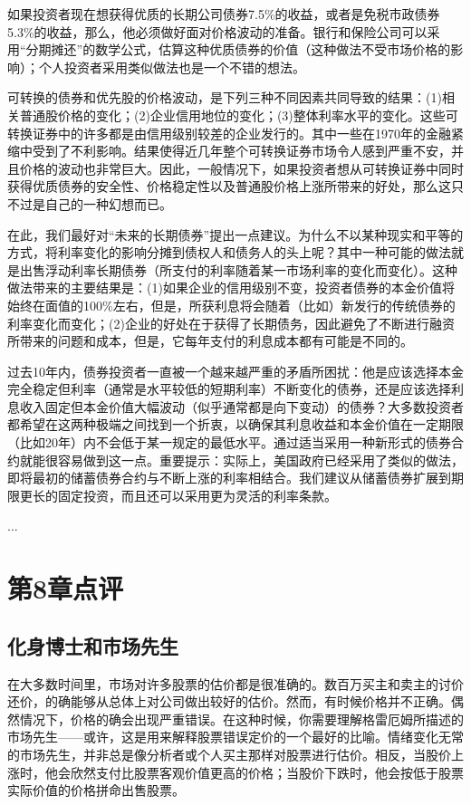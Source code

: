 \documentclass[12pt,oneside]{book}
\begin{document}
如果投资者现在想获得优质的长期公司债券7.5\%的收益，或者是免税市政债券5.3\%的收益，那么，他必须做好面对价格波动的准备。银行和保险公司可以采用“分期摊还”的数学公式，估算这种优质债券的价值（这种做法不受市场价格的影响）；个人投资者采用类似做法也是一个不错的想法。

可转换的债券和优先股的价格波动，是下列三种不同因素共同导致的结果：(1)相关普通股价格的变化；(2)企业信用地位的变化；(3)整体利率水平的变化。这些可转换证券中的许多都是由信用级别较差的企业发行的。其中一些在1970年的金融紧缩中受到了不利影响。结果使得近几年整个可转换证券市场令人感到严重不安，并且价格的波动也非常巨大。因此，一般情况下，如果投资者想从可转换证券中同时获得优质债券的安全性、价格稳定性以及普通股价格上涨所带来的好处，那么这只不过是自己的一种幻想而已。

在此，我们最好对“未来的长期债券”提出一点建议。为什么不以某种现实和平等的方式，将利率变化的影响分摊到债权人和债务人的头上呢？其中一种可能的做法就是出售浮动利率长期债券（所支付的利率随着某一市场利率的变化而变化）。这种做法带来的主要结果是：(1)如果企业的信用级别不变，投资者债券的本金价值将始终在面值的100\%左右，但是，所获利息将会随着（比如）新发行的传统债券的利率变化而变化；(2)企业的好处在于获得了长期债务，因此避免了不断进行融资所带来的问题和成本，但是，它每年支付的利息成本都有可能是不同的。

过去10年内，债券投资者一直被一个越来越严重的矛盾所困扰：他是应该选择本金完全稳定但利率（通常是水平较低的短期利率）不断变化的债券，还是应该选择利息收入固定但本金价值大幅波动（似乎通常都是向下变动）的债券？大多数投资者都希望在这两种极端之间找到一个折衷，以确保其利息收益和本金价值在一定期限（比如20年）内不会低于某一规定的最低水平。通过适当采用一种新形式的债券合约就能很容易做到这一点。重要提示：实际上，美国政府已经采用了类似的做法，即将最初的储蓄债券合约与不断上涨的利率相结合。我们建议从储蓄债券扩展到期限更长的固定投资，而且还可以采用更为灵活的利率条款。

...



\section{第8章点评}
\subsection{化身博士和市场先生}
在大多数时间里，市场对许多股票的估价都是很准确的。数百万买主和卖主的讨价还价，的确能够从总体上对公司做出较好的估价。然而，有时候价格并不正确。偶然情况下，价格的确会出现严重错误。在这种时候，你需要理解格雷厄姆所描述的市场先生——或许，这是用来解释股票错误定价的一个最好的比喻。情绪变化无常的市场先生，并非总是像分析者或个人买主那样对股票进行估价。相反，当股价上涨时，他会欣然支付比股票客观价值更高的价格；当股价下跌时，他会按低于股票实际价值的价格拼命出售股票。
\end{document}
